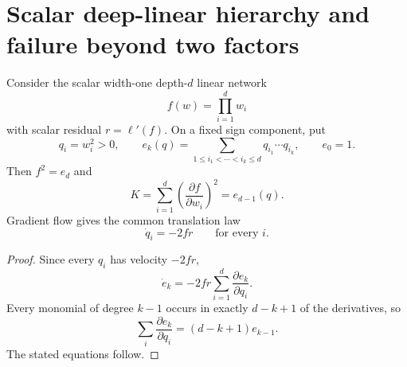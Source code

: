\section{Scalar deep-linear hierarchy and failure beyond two factors}
\label{sec:deep-linear}

Consider the scalar width-one depth-$d$ linear network
\begin{equation}
  f(w)=\prod_{i=1}^d w_i
  \label{eq:scalar-network}
\end{equation}
with scalar residual $r=\ell'(f)$.  On a fixed sign component, put
\begin{equation}
  q_i=w_i^2>0,
  \qquad
  e_k(q)=\sum_{1\leq i_1<\cdots<i_k\leq d}q_{i_1}\cdots q_{i_k},
  \qquad e_0=1.
\end{equation}
Then $f^2=e_d$ and
\begin{equation}
  K=\sum_{i=1}^d\left(\frac{\partial f}{\partial w_i}\right)^2
  =e_{d-1}(q).
  \label{eq:scalar-K}
\end{equation}
Gradient flow gives the common translation law
\begin{equation}
  \dot q_i=-2fr
  \qquad \text{for every }i.
  \label{eq:q-common-velocity}
\end{equation}


\begin{proof}
Since every $q_i$ has velocity $-2fr$,
\begin{equation}
  \dot e_k=-2fr\sum_{i=1}^d\frac{\partial e_k}{\partial q_i}.
\end{equation}
Every monomial of degree $k-1$ occurs in exactly $d-k+1$ of the derivatives, so
\begin{equation}
  \sum_i\frac{\partial e_k}{\partial q_i}=(d-k+1)e_{k-1}.
\end{equation}
The stated equations follow.
\end{proof}

